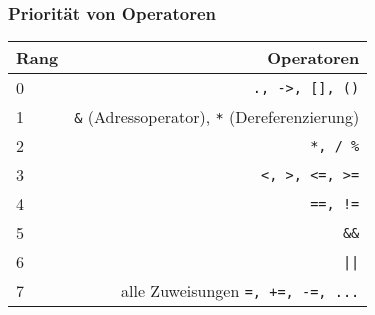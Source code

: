 \subsubsection{Priorität von Operatoren}
\begin{table}[H]
  \centering
  \begin{tabular}{l r}
    \hline
    Rang & Operatoren \\
    \hline
    0 & \texttt{., ->, [], ()}\\
    1 & \texttt{\&} (Adressoperator), \texttt{*} (Dereferenzierung)\\
    2 & \texttt{*, / \%}\\
    3 & \texttt{<, >, <=, >=}\\
    4 & \texttt{==, !=}\\
    5 & \texttt{\&\&}\\
    6 & \texttt{||}\\
    7 & alle Zuweisungen \texttt{=, +=, -=, ...}\\
    \hline
  \end{tabular}
\end{table}                                                                                                                                       

